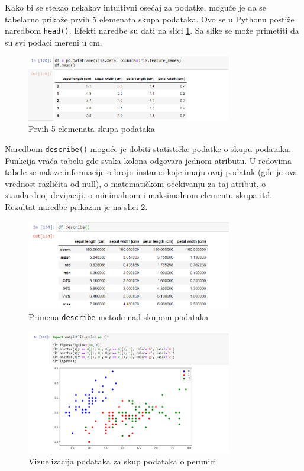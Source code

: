 \documentclass[a4paper,12pt]{report}
\begin{document}
Kako bi se stekao nekakav intuitivni osećaj za podatke, moguće je da se tabelarno prikaže prvih 5 elemenata skupa podataka. Ovo se u Pythonu postiže naredbom \texttt{head()}. Efekti naredbe su dati na slici \ref{fig:irishead}. Sa slike se može primetiti da su svi podaci mereni u cm.   
\begin{figure}[h]
    \centering
    \includegraphics[width=0.8\textwidth]{iris_head.png}
    \caption{Prvih 5 elemenata skupa podataka}\label{fig:irishead}
\end{figure}

Naredbom \texttt{describe()} moguće je dobiti statističke podatke o skupu podataka. Funkcija vraća tabelu gde svaka kolona odgovara jednom atributu. U redovima tabele se nalaze informacije o broju instanci koje imaju ovaj podatak (gde je ova vrednost različita od null), o matematičkom očekivanju za taj atribut, o standardnoj devijaciji, o minimalnom i maksimalnom elementu skupa itd. Rezultat naredbe prikazan je na slici \ref{fig:irisdescribe}.
\begin{figure}[h]
    \centering
    \includegraphics[width=0.8\textwidth]{iris_describe.png}
    \caption{Primena \texttt{describe} metode nad skupom podataka}\label{fig:irisdescribe}
\end{figure}

\begin{figure}[h]
    \centering
    \includegraphics[width=0.8\textwidth]{iris_3_scatter.png}
    \caption{Vizuelizacija podataka za skup podataka o perunici}\label{fig:irisscatter}
\end{figure}
\end{document}
